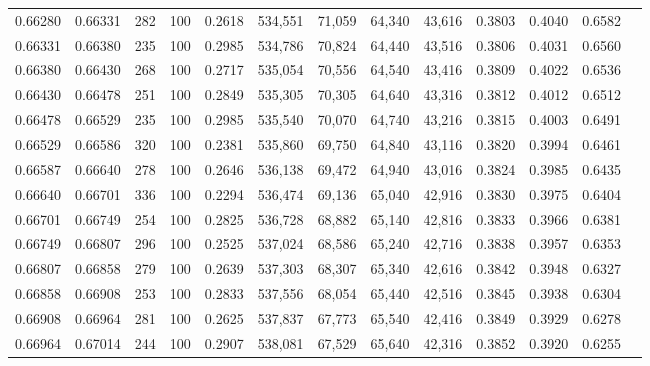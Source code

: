 \begin{tabular}{rrrrrrrrrrrrr}
0.66280 & 0.66331 &   282 & 100 &                                     0.2618 & 534,551 &  71,059 &  64,340 &  43,616 & 0.3803 & 0.4040 & 0.6582 \\
0.66331 & 0.66380 &   235 & 100 &                                     0.2985 & 534,786 &  70,824 &  64,440 &  43,516 & 0.3806 & 0.4031 & 0.6560 \\
0.66380 & 0.66430 &   268 & 100 &                                     0.2717 & 535,054 &  70,556 &  64,540 &  43,416 & 0.3809 & 0.4022 & 0.6536 \\
0.66430 & 0.66478 &   251 & 100 &                                     0.2849 & 535,305 &  70,305 &  64,640 &  43,316 & 0.3812 & 0.4012 & 0.6512 \\
0.66478 & 0.66529 &   235 & 100 &                                     0.2985 & 535,540 &  70,070 &  64,740 &  43,216 & 0.3815 & 0.4003 & 0.6491 \\
0.66529 & 0.66586 &   320 & 100 &                                     0.2381 & 535,860 &  69,750 &  64,840 &  43,116 & 0.3820 & 0.3994 & 0.6461 \\
0.66587 & 0.66640 &   278 & 100 &                                     0.2646 & 536,138 &  69,472 &  64,940 &  43,016 & 0.3824 & 0.3985 & 0.6435 \\
0.66640 & 0.66701 &   336 & 100 &                                     0.2294 & 536,474 &  69,136 &  65,040 &  42,916 & 0.3830 & 0.3975 & 0.6404 \\
0.66701 & 0.66749 &   254 & 100 &                                     0.2825 & 536,728 &  68,882 &  65,140 &  42,816 & 0.3833 & 0.3966 & 0.6381 \\
0.66749 & 0.66807 &   296 & 100 &                                     0.2525 & 537,024 &  68,586 &  65,240 &  42,716 & 0.3838 & 0.3957 & 0.6353 \\
0.66807 & 0.66858 &   279 & 100 &                                     0.2639 & 537,303 &  68,307 &  65,340 &  42,616 & 0.3842 & 0.3948 & 0.6327 \\
0.66858 & 0.66908 &   253 & 100 &                                     0.2833 & 537,556 &  68,054 &  65,440 &  42,516 & 0.3845 & 0.3938 & 0.6304 \\
0.66908 & 0.66964 &   281 & 100 &                                     0.2625 & 537,837 &  67,773 &  65,540 &  42,416 & 0.3849 & 0.3929 & 0.6278 \\
0.66964 & 0.67014 &   244 & 100 &                                     0.2907 & 538,081 &  67,529 &  65,640 &  42,316 & 0.3852 & 0.3920 & 0.6255 \\

\end{tabular}
